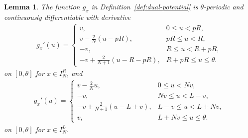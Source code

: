 \documentclass{article}
\newtheorem{lemma}[theorem]{Lemma}
\begin{document}
\begin{lemma}
\label{lem:dual-potential-well-defined}
The function \(g_x\) in Definition~\ref{def:dual-potential} is \(\theta\)-periodic and continuously differentiable with derivative
\begin{align}\label{def:dual-potential-right}
    g_x'(u)
    =
    \begin{cases}
        v,
        & 0\leq u< pR,\\[1mm]
        \displaystyle
        v-\frac{2}{N}(u-pR),
        & pR\leq u< R,\\[3mm]
        -v,
        & R\leq u< R+pR,\\[1mm]
        \displaystyle
        -v+\frac{2}{N+1}(u-R-pR),
        & R+pR\leq u\leq\theta.
    \end{cases}
\end{align}
on \([0,\theta]\) for \(x\in I_N^R\), and
\begin{align}\label{def:dual-potential-left}
    g_x'(u)
    =
    \begin{cases}
        \displaystyle
        v-\frac{2}{N}u,
        & 0\leq u< Nv,\\[3mm]
        -v,
        & Nv\leq u < L-v,\\[1mm]
        \displaystyle
        -v+\frac{2}{N+1}(u-L+v),
        & L-v\leq u < L+Nv,\\[3mm]
        v,
        & L+Nv\leq u\leq\theta.
    \end{cases}
\end{align}
on \([0,\theta]\) for \(x\in I_N^L\).
\end{lemma}
\end{document}
